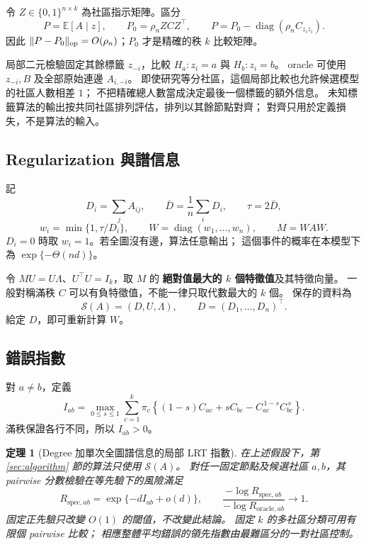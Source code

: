 \documentclass[11pt,a4paper]{article}
\theoremstyle{zhplain}
\newtheorem{theorem}{定理}[section]
\numberwithin{equation}{section}
\newcommand{\E}{\mathbb E}
\newcommand{\diag}{\operatorname{diag}}
\newcommand{\op}{\mathrm{op}}
\newcommand{\cS}{\mathcal S}
\DeclarePairedDelimiter{\norm}{\lVert}{\rVert}
\begin{document}
令 \(Z\in\{0,1\}^{n\times k}\) 為社區指示矩陣。區分
\begin{equation}
 P=\E[A\mid z],
 \qquad
 P_0=\rho_n ZCZ^\top,
 \qquad
 P=P_0-\diag(\rho_n C_{z_i z_i}).
 \label{eq:hollow}
\end{equation}
因此 \(\norm{P-P_0}_{\op}=O(\rho_n)\)；\(P_0\) 才是精確的秩 \(k\) 比較矩陣。

局部二元檢驗固定其餘標籤 \(z_{-i}\)，比較
\(H_a:z_i=a\) 與 \(H_b:z_i=b\)。
oracle 可使用 \(z_{-i},B\) 及全部原始連邊 \(A_{i,-i}\)。
即使研究等分社區，這個局部比較也允許候選模型的社區人數相差 \(1\)；
不把精確總人數當成決定最後一個標籤的額外信息。
未知標籤算法的輸出按共同社區排列評估，排列以其餘節點對齊；
對齊只用於定義損失，不是算法的輸入。

\subsection{Regularization 與譜信息}
記
\[
 D_i=\sum_jA_{ij},\qquad
 \bar D=\frac1n\sum_iD_i,\qquad
 \tau=2\bar D,
\]
\begin{equation}
 w_i=\min\{1,\tau/D_i\},\qquad
 W=\diag(w_1,\ldots,w_n),\qquad M=WAW.
 \label{eq:weights}
\end{equation}
\(D_i=0\) 時取 \(w_i=1\)。若全圖沒有邊，算法任意輸出；
這個事件的概率在本模型下為 \(\exp\{-\Theta(nd)\}\)。

令 \(MU=U\Lambda\)、\(U^\top U=I_k\)，取 \(M\) 的
\textbf{絕對值最大的 \(k\) 個特徵值}及其特徵向量。
一般對稱滿秩 \(C\) 可以有負特徵值，不能一律只取代數最大的 \(k\) 個。
保存的資料為
\[
 \cS(A)=(D,U,\Lambda),\qquad D=(D_1,\ldots,D_n)^\top.
\]
給定 \(D\)，即可重新計算 \(W\)。

\subsection{錯誤指數}
對 \(a\ne b\)，定義
\begin{equation}
 I_{ab}=
 \max_{0\le s\le1}\sum_{c=1}^k\pi_c
 \left\{(1-s)C_{ac}+sC_{bc}
             -C_{ac}^{\,1-s}C_{bc}^{\,s}\right\}.
 \label{eq:chernoff-rate}
\end{equation}
滿秩保證各行不同，所以 \(I_{ab}>0\)。

\begin{theorem}[Degree 加單次全圖譜信息的局部 LRT 指數]
\label{thm:main}
在上述假設下，第 \ref{sec:algorithm} 節的算法只使用 \(\cS(A)\)。
對任一固定節點及候選社區 \(a,b\)，其 pairwise 分數檢驗在等先驗下的風險滿足
\begin{equation}
 R_{\mathrm{spec},ab}
   =\exp\{-dI_{ab}+o(d)\},
 \qquad
 \frac{-\log R_{\mathrm{spec},ab}}
      {-\log R_{\mathrm{oracle},ab}}\longrightarrow1.
 \label{eq:main-risk}
\end{equation}
固定正先驗只改變 \(O(1)\) 的閾值，不改變此結論。
固定 \(k\) 的多社區分類可用有限個 pairwise 比較；
相應整體平均錯誤的領先指數由最難區分的一對社區控制。
\end{theorem}
\end{document}
